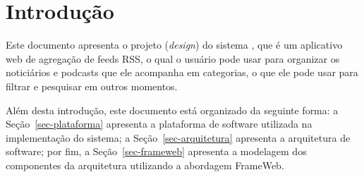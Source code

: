\chapter{Introdução}
\label{sec-intro}
\vspace{-1cm}

Este documento apresenta o projeto (\textit{design}) do sistema \emph{\imprimirtitulo}, que é um aplicativo web de agregação de feeds RSS, o qual o usuário pode usar para organizar os noticiários e podcasts que ele acompanha em categorias, o que ele pode usar para filtrar e pesquisar em outros momentos.


Além desta introdução, este documento está organizado da seguinte forma: 
	a Seção~\ref{sec-plataforma} apresenta a plataforma de software utilizada na implementação do sistema; 
	a Seção~\ref{sec-arquitetura} apresenta a arquitetura de software; por fim, 
	a Seção~\ref{sec-frameweb} apresenta a modelagem dos componentes da arquitetura utilizando a abordagem FrameWeb.

